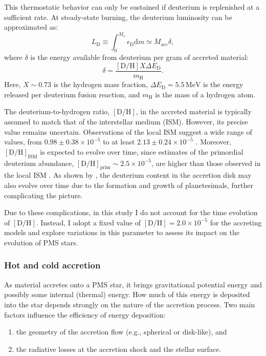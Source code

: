 \documentclass[12pt,a4paper]{article}
\newcommand{\mr}{\mathrm}
\newcommand{\dd}[1]{\mathrm{d}#1}
\begin{document}
This thermostatic behavior can only be sustained if deuterium is replenished at a sufficient rate. At steady-state burning, the deuterium luminosity can be approximated as:
\begin{equation}
  L_\mr{D} \equiv \int_0^{M_\star} \epsilon_\mr{D}\dd{m} \simeq \dot{M}_\mr{acc} \delta,
\end{equation}
where $\delta$ is the energy available from deuterium per gram of accreted material:
\begin{equation}
  \delta = \frac{[\mr{D/H}]X\Delta E_\mr{D}}{m_\mr{H}}.
\end{equation}
Here, $X \sim 0.73$ is the hydrogen mass fraction, $\Delta E_\mr{D} = 5.5\,\mr{MeV}$ is the energy released per deuterium fusion reaction, and $m_\mr{H}$ is the mass of a hydrogen atom.

The deuterium-to-hydrogen ratio, $[\mr{D/H}]$, in the accreted material is typically assumed to match that of the interstellar medium (ISM). However, its precise value remains uncertain. Observations of the local ISM suggest a wide range of values, from $0.98 \pm 0.38 \times 10^{-5}$ \parencite{HebrardEtAl2005} to at least $2.13 \pm 0.24 \times 10^{-5}$ \parencite{LinskyEtAl2006}. Moreover, $[\mr{D/H}]_\mr{ISM}$ is expected to evolve over time, since estimates of the primordial deuterium abundance, $[\mr{D/H}]_\mr{prim} \sim 2.5 \times 10^{-5}$, are higher than those observed in the local ISM \parencite[e.g.,][]{Prantzos2007}. As shown by \textcite{KunitomoGuillot2021}, the deuterium content in the accretion disk may also evolve over time due to the formation and growth of planetesimals, further complicating the picture.

Due to these complications, in this study I do not account for the time evolution of $[\mr{D}/\mr{H}]$. Instead, I adopt a fixed value of $[\mr{D}/\mr{H}] = 2.0 \times 10^{-5}$ for the accreting models and explore variations in this parameter to assess its impact on the evolution of PMS stars.

\subsubsection{Hot and cold accretion}
\label{sec:hot_cold_accretion}

As material accretes onto a PMS star, it brings gravitational potential energy and possibly some internal (thermal) energy. How much of this energy is deposited into the star depends strongly on the nature of the accretion process. Two main factors influence the efficiency of energy deposition:
\begin{enumerate}
  \item the geometry of the accretion flow (e.g., spherical or disk-like), and
  \item the radiative losses at the accretion shock and the stellar surface.
\end{enumerate}
\end{document}
